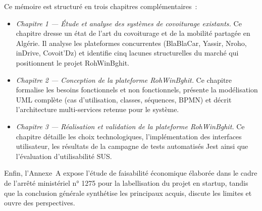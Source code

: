 Ce mémoire est structuré en trois chapitres complémentaires~:

\begin{itemize}[leftmargin=1.8em]
  \item \textit{Chapitre 1 --- Étude et analyse des systèmes de covoiturage existants.} Ce chapitre dresse un état de l'art du covoiturage et de la mobilité partagée en Algérie. Il analyse les plateformes concurrentes (BlaBlaCar, Yassir, Nroho, inDrive, Covoit'Dz) et identifie cinq lacunes structurelles du marché qui positionnent le projet RohWinBghit.
  \item \textit{Chapitre 2 --- Conception de la plateforme RohWinBghit.} Ce chapitre formalise les besoins fonctionnels et non fonctionnels, présente la modélisation UML complète (cas d'utilisation, classes, séquences, BPMN) et décrit l'architecture multi-services retenue pour le système.
  \item \textit{Chapitre 3 --- Réalisation et validation de la plateforme RohWinBghit.} Ce chapitre détaille les choix technologiques, l'implémentation des interfaces utilisateur, les résultats de la campagne de tests automatisés Jest ainsi que l'évaluation d'utilisabilité SUS.
\end{itemize}

Enfin, l'Annexe~A expose l'étude de faisabilité économique élaborée dans le cadre de l'arrêté ministériel n° 1275 pour la labellisation du projet en startup, tandis que la conclusion générale synthétise les principaux acquis, discute les limites et ouvre des perspectives.
